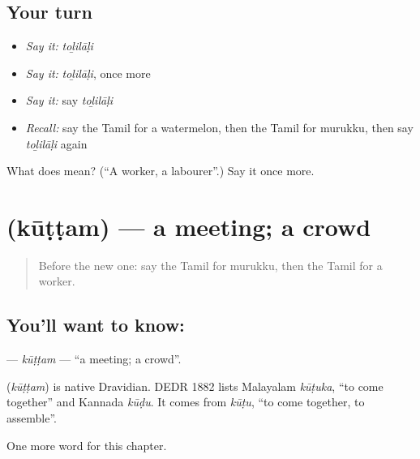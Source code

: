 \subsection*{Your turn}
\begin{itemize}
\raggedright
  \item \emph{Say it:} \emph{toḻilāḷi}
  \item \emph{Say it:} \emph{toḻilāḷi}, once more
  \item \emph{Say it:} say \emph{toḻilāḷi}
  \item \emph{Recall:} say the Tamil for a watermelon, then the Tamil for murukku, then say \emph{toḻilāḷi} again
\end{itemize}

\begin{tcolorbox}[breakable,colback=teal!4,colframe=teal!35!black,title={Before you move on}]
What does  mean? (\textquotedblleft{}A worker, a labourer\textquotedblright{}.) Say it once more.
\end{tcolorbox}
\section[\texorpdfstring{\ta{கூட்டம்} (kūṭṭam)}{கூட்டம் (kūṭṭam)}]{ (kūṭṭam) — a meeting; a crowd}

\label{lesson:TA-C279-kuttam}



\begin{quote}
Before the new one: say the Tamil for murukku, then the Tamil for a worker.
\end{quote}

\subsection*{You'll want to know: }
\textbf{} — \emph{kūṭṭam} — \textquotedblleft{}a meeting; a crowd\textquotedblright{}.

\begin{cousinweb}
\textbf{} (\emph{kūṭṭam}) is native Dravidian. DEDR 1882 lists Malayalam \emph{kūṭuka}, \textquotedblleft{}to come together\textquotedblright{} and Kannada \emph{kūḍu}. It comes from \emph{kūṭu}, \textquotedblleft{}to come together, to assemble\textquotedblright{}.
\end{cousinweb}

\begin{grammarlens}[title={What you've built}]
One more word for this chapter.
\end{grammarlens}

